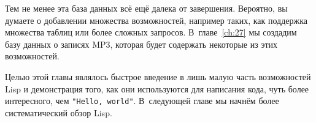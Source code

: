 Тем не менее эта база данных всё ещё далека от завершения. Вероятно, вы думаете о
добавлении множества возможностей, например таких, как поддержка множества таблиц или
более сложных запросов. В~главе~\ref{ch:27} мы создадим базу данных о записях MP3, которая будет
содержать некоторые из этих возможностей.

Целью этой главы являлось быстрое введение в лишь малую часть возможностей Lisp и
демонстрация того, как они используются для написания кода, чуть более интересного, чем
\lstinline{"Hello, world"}. В~следующей главе мы начнём более систематический обзор Lisp.

